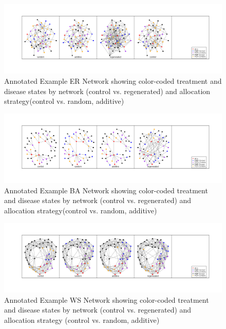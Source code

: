 \documentclass{article}
\theoremstyle{definition}
\begin{document}
\newpage
\begin{figure}
    \centering
    \includegraphics[width=\linewidth]{Original Figures/ER Network Example.png}
    \caption{Annotated Example ER Network showing color-coded treatment and disease states by network (control vs. regenerated) and allocation strategy(control vs. random, additive)}
    \label{fig: D1}
\end{figure}
\begin{figure}[H]
    \centering
    \includegraphics[width=\linewidth]{Original Figures/BA Network Example.png}
    \caption{Annotated Example BA Network showing color-coded treatment and disease states by network (control vs. regenerated) and allocation strategy(control vs. random, additive)}
    \label{fig: D2}
\end{figure}
\begin{figure}[H]
    \centering
    \includegraphics[width=\linewidth]{Original Figures/WS Network Example.png}
    \caption{Annotated Example WS Network showing color-coded treatment and disease states by network (control vs. regenerated) and allocation strategy (control vs. random, additive)}
    \label{fig: D3}
\end{figure}
\end{document}
